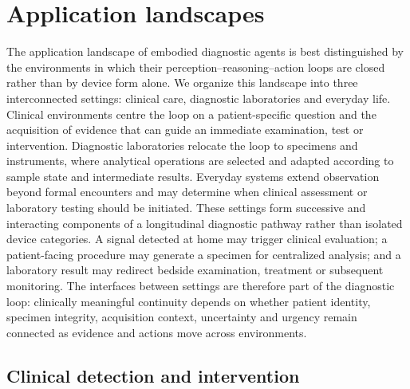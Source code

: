 \section{Application landscapes}
\label{sec:application_landscapes}

%
The application landscape of embodied diagnostic agents is best distinguished by the environments in which their perception--reasoning--action loops are closed rather than by device form alone. We organize this landscape into three interconnected settings: clinical care, diagnostic laboratories and everyday life. Clinical environments centre the loop on a patient-specific question and the acquisition of evidence that can guide an immediate examination, test or intervention. Diagnostic laboratories relocate the loop to specimens and instruments, where analytical operations are selected and adapted according to sample state and intermediate results. Everyday systems extend observation beyond formal encounters and may determine when clinical assessment or laboratory testing should be initiated. These settings form successive and interacting components of a longitudinal diagnostic pathway rather than isolated device categories. A signal detected at home may trigger clinical evaluation; a patient-facing procedure may generate a specimen for centralized analysis; and a laboratory result may redirect bedside examination, treatment or subsequent monitoring. The interfaces between settings are therefore part of the diagnostic loop: clinically meaningful continuity depends on whether patient identity, specimen integrity, acquisition context, uncertainty and urgency remain connected as evidence and actions move across environments.


\subsection{Clinical detection and intervention}
\label{subsec:clinical_detection_intervention}

